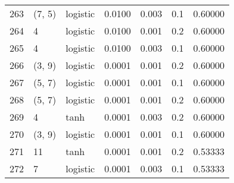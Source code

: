 \begin{tabular}{lllrrrr}
263 &      (7, 5) &  logistic &  0.0100 &  0.003 &  0.1 &   0.60000 \\
264 &           4 &  logistic &  0.0100 &  0.001 &  0.2 &   0.60000 \\
265 &           4 &  logistic &  0.0100 &  0.003 &  0.1 &   0.60000 \\
266 &      (3, 9) &  logistic &  0.0001 &  0.001 &  0.2 &   0.60000 \\
267 &      (5, 7) &  logistic &  0.0001 &  0.001 &  0.1 &   0.60000 \\
268 &      (5, 7) &  logistic &  0.0001 &  0.001 &  0.2 &   0.60000 \\
269 &           4 &      tanh &  0.0001 &  0.003 &  0.2 &   0.60000 \\
270 &      (3, 9) &  logistic &  0.0001 &  0.001 &  0.1 &   0.60000 \\
271 &          11 &      tanh &  0.0001 &  0.001 &  0.2 &   0.53333 \\
272 &           7 &  logistic &  0.0001 &  0.003 &  0.1 &   0.53333 \\
\bottomrule
\end{tabular}
